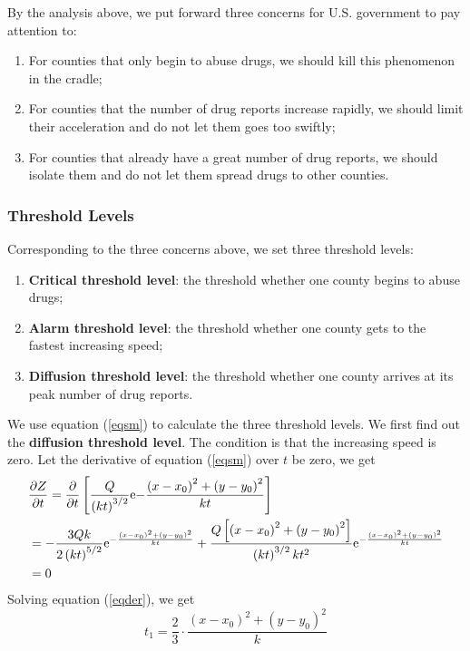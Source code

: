 \documentclass{mcmthesis}
\numberwithin{equation}{section}
\numberwithin{figure}{section}
\numberwithin{table}{section}
\theoremstyle{mydef}
\begin{document}
By the analysis above, we put forward three concerns for U.S. government to pay attention to:
\begin{enumerate}
\item For counties that only begin to abuse drugs, we should kill this phenomenon in the cradle;
\item  For counties that the number of drug reports increase rapidly, we should limit their acceleration and do not let them goes too swiftly;
\item For counties that already have a great number of drug reports, we should isolate them and do not let them spread drugs to other counties.
\end{enumerate}

\subsubsection{Threshold Levels}

Corresponding to the three concerns above, we set three threshold levels:
\begin{enumerate}
\item {\bf{Critical threshold level}}: the threshold whether one county begins to abuse drugs;
\item {\bf{Alarm threshold level}}: the threshold whether one county gets to the fastest increasing speed;
\item {\bf{Diffusion threshold level}}: the threshold whether one county arrives at its peak number of drug reports.
\end{enumerate}

We use equation (\ref{eqsm}) to calculate the three threshold levels. We first find out the {\bf{diffusion threshold level}}. The condition is that the increasing speed is zero. Let the derivative of equation (\ref{eqsm}) over $t$ be zero, we get
\begin{equation}
\begin{aligned}
&{\frac{\partial Z}{\partial t}}
={\frac {\partial }{\partial t}} \left[ {\frac {Q}{ \left( kt \right) ^
{3/2}}{{\rm e}{-{\frac { \left( x-x_0 \right) ^{2}+ \left( y-y_0 \right) 
^{2}}{kt}}}}} \right] \\
&=-{\frac {3Qk}{2 \left( kt \right) ^{5/2}}{
{\rm e}^{-{\frac { \left( x-x_0 \right) ^{2}+ \left( y-y_0 \right) ^{2}}{k
t}}}}}+{\frac {Q \left[  \left( x-x_0 \right) ^{2}+ \left( y-y_0 \right) ^
{2} \right] }{ \left( kt \right) ^{3/2}k{t}^{2}}{{\rm e}^{-{\frac {
 \left( x-x_0 \right) ^{2}+ \left( y-y_0 \right) ^{2}}{kt}}}}}\\
 &=0
\end{aligned}
\label{eqder}
\end{equation}
Solving equation (\ref{eqder}), we get
\begin{equation}
t_1=\frac{2}{3}\cdot\frac{(x-x_0)^2+(y-y_0)^2}{k}
\end{equation}
\end{document}

